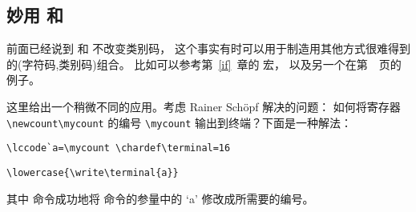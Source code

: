 \documentclass{book}
\begin{document}
\subsection{妙用  和 }

前面已经说到  和  不改变类别码，
这个事实有时可以用于制造用其他方式很难得到的(字符码,类别码)组合。
比如可以参考第~\ref{if}~章的  宏，
以及另一个在第~\pageref{spsb:truc}~页的例子。

这里给出一个稍微不同的应用。考虑 Rainer Sch\"opf 解决的问题：
如何将寄存器 \verb-\newcount\mycount- 的编号 \verb-\mycount-
输出到终端？下面是一种解法：
\begin{verbatim}
\lccode`a=\mycount \chardef\terminal=16
\end{verbatim}
\begin{verbatim}
\lowercase{\write\terminal{a}}
\end{verbatim}
其中  命令成功地将  命令的参量中的
`\n a' 修改成所需要的编号。
\end{document}
